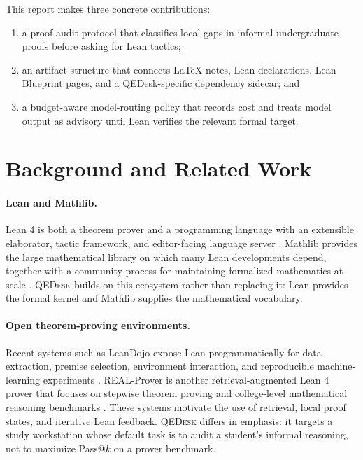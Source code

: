 \documentclass[11pt]{article}
\newcommand{\qedesk}{\textsc{QEDesk}}
\newcommand{\lean}{Lean 4}
\newcommand{\mathlib}{Mathlib}
\begin{document}
This report makes three concrete contributions:

\begin{enumerate}[leftmargin=2em]
  \item a proof-audit protocol that classifies local gaps in informal
  undergraduate proofs before asking for Lean tactics;
  \item an artifact structure that connects LaTeX notes, Lean declarations,
  Lean Blueprint pages, and a QEDesk-specific dependency sidecar; and
  \item a budget-aware model-routing policy that records cost and treats model
  output as advisory until Lean verifies the relevant formal target.
\end{enumerate}

\section{Background and Related Work}

\paragraph{Lean and Mathlib.}
\lean{} is both a theorem prover and a programming language with an extensible
elaborator, tactic framework, and editor-facing language server
\cite{lean4}.  \mathlib{} provides the large mathematical library on which many
Lean developments depend, together with a community process for maintaining
formalized mathematics at scale \cite{mathlib}.  \qedesk{} builds on this
ecosystem rather than replacing it: Lean provides the formal kernel and
\mathlib{} supplies the mathematical vocabulary.

\paragraph{Open theorem-proving environments.}
Recent systems such as LeanDojo expose Lean programmatically for data
extraction, premise selection, environment interaction, and reproducible
machine-learning experiments \cite{leandojo}.  REAL-Prover is another
retrieval-augmented Lean 4 prover that focuses on stepwise theorem proving and
college-level mathematical reasoning benchmarks \cite{realprover}.  These
systems motivate the use of retrieval, local proof states, and iterative Lean
feedback.  \qedesk{} differs in emphasis: it targets a study workstation whose
default task is to audit a student's informal reasoning, not to maximize
Pass@\(k\) on a prover benchmark.
\end{document}
